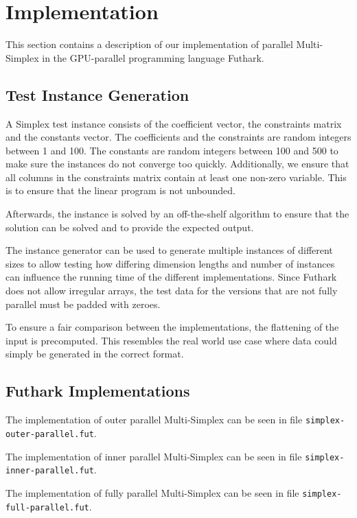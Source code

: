 \section{Implementation}

This section contains a description of our implementation of parallel Multi-Simplex in the GPU-parallel programming language Futhark.

\subsection{Test Instance Generation}
A Simplex test instance consists of the coefficient vector, the constraints matrix and the constants vector. The coefficients and the constraints are random integers between 1 and 100. The constants are random integers between 100 and 500 to make sure the instances do not converge too quickly. Additionally, we ensure that all columns in the constraints matrix contain at least one non-zero variable. This is to ensure that the linear program is not unbounded.

Afterwards, the instance is solved by an off-the-shelf algorithm to ensure that the solution can be solved and to provide the expected output. 

The instance generator can be used to generate multiple instances of different sizes to allow testing how differing dimension lengths and number of instances can influence the running time of the different implementations. Since Futhark does not allow irregular arrays, the test data for the versions that are not fully parallel must be padded with zeroes.

To ensure a fair comparison between the implementations, the flattening of the input is precomputed. This resembles the real world use case where data could simply be generated in the correct format.

\subsection{Futhark Implementations}
The implementation of outer parallel Multi-Simplex can be seen in file \texttt{simplex-outer-parallel.fut}.

\newpar
The implementation of inner parallel Multi-Simplex can be seen in file \texttt{simplex-inner-parallel.fut}.

\newpar
The implementation of fully parallel Multi-Simplex can be seen in file \texttt{simplex-full-parallel.fut}.
